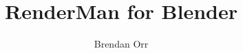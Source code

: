 \documentclass[letterpaper,12pt,twoside]{book} %
\begin{document}
\author{Brendan Orr}
\title{RenderMan for Blender}
\date{\month \year}



\frontmatter
\maketitle


\pagestyle{fancy}
\fancyhead{}
\fancyfoot{}
\fancyfoot[RO,LE]{\thepage}

\renewcommand{\headrulewidth}{0.4pt}
\renewcommand{\footrulewidth}{0.4pt}
\renewcommand{\voffset}{0.0pt}

\tableofcontents
\mainmatter









\backmatter
\end{document}
